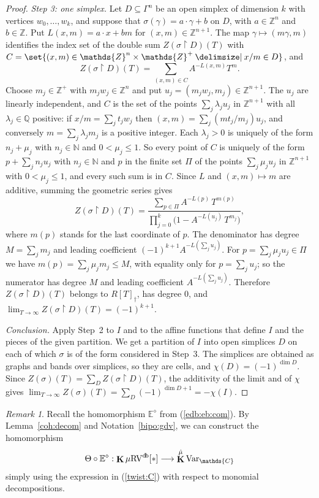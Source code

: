 \documentclass[12pt]{amsart}
\theoremstyle{plain}
\theoremstyle{definition}
\theoremstyle{remark}
\newtheorem{rem}[thm]{Remark}
\numberwithin{equation}{section}
\theoremstyle{plain}
\newcommand{\RV}{\textup{RV}}
\newcommand{\Z}{\mathds{Z}}
\newcommand{\C}{\mathds{C}}
\newcommand{\Q}{\mathds{Q}}
\newcommand{\N}{\mathds{N}}
\newcommand{\0}{\emptyset}
\newcommand{\bb}[1]{\mathbb{#1}}
\newcommand{\limplies}{\rightarrow}
\newcommand{\rest}{\upharpoonright}
\newcommand{\fun}{\longrightarrow}
\newcommand{\efun}{\longmapsto}
\newcommand{\sub}{\subseteq}
\providecommand\given{}
\newcommand\SetSymbol[1][]{%
\nonscript \: #1 \vert
\allowbreak
\nonscript\:
\mathopen{}}
\renewcommand\given{\SetSymbol[\delimsize]}
\newcommand{\mgRV}{{\mu}{\RV}}
\DeclareMathOperator{\ggk}{\mathbf{K}}
\DeclareMathOperator{\db}{d \! b}
\newcommand{\var}{\textup{Var}}
\newcommand{\gmv}{\ggk^{\hat \mu}\var_{\C}}
\begin{document}
\begin{proof}
\emph{Step 3: one simplex.} Let $D \sub \Gamma^n$ be an open simplex of dimension $k$ with vertices $w_0, \ldots, w_k$, and suppose that $\sigma(\gamma) = a \cdot \gamma + b$ on $D$, with $a \in \Z^n$ and $b \in \Z$. Put $L(x, m) = a \cdot x + b m$ for $(x, m) \in \Z^{n+1}$. The map $\gamma \efun (m\gamma, m)$ identifies the index set of the double sum $Z(\sigma \rest D)(T)$ with $C = \set{(x, m) \in \Z^n \times \Z^+ \given x/m \in D}$, and
\[
Z(\sigma \rest D)(T) = \sum_{(x,m) \in C} A^{-L(x,m)} T^m .
\]
Choose $m_j \in \Z^+$ with $m_j w_j \in \Z^n$ and put $u_j = (m_j w_j, m_j) \in \Z^{n+1}$. The $u_j$ are linearly independent, and $C$ is the set of the points $\sum_j \lambda_j u_j$ in $\Z^{n+1}$ with all $\lambda_j \in \Q$ positive: if $x/m = \sum_j t_j w_j$ then $(x, m) = \sum_j (m t_j / m_j) u_j$, and conversely $m = \sum_j \lambda_j m_j$ is a positive integer. Each $\lambda_j > 0$ is uniquely of the form $n_j + \mu_j$ with $n_j \in \N$ and $0 < \mu_j \leq 1$. So every point of $C$ is uniquely of the form $p + \sum_j n_j u_j$ with $n_j \in \N$ and $p$ in the finite set $\Pi$ of the points $\sum_j \mu_j u_j$ in $\Z^{n+1}$ with $0 < \mu_j \leq 1$, and every such sum is in $C$. Since $L$ and $(x, m) \efun m$ are additive, summing the geometric series gives
\[
Z(\sigma \rest D)(T) = \frac{\sum_{p \in \Pi} A^{-L(p)}\, T^{m(p)}}{\prod_{j=0}^{k} \bigl(1 - A^{-L(u_j)}\, T^{m_j}\bigr)},
\]
where $m(p)$ stands for the last coordinate of $p$. The denominator has degree $M = \sum_j m_j$ and leading coefficient $(-1)^{k+1} A^{-L(\sum_j u_j)}$. For $p = \sum_j \mu_j u_j \in \Pi$ we have $m(p) = \sum_j \mu_j m_j \leq M$, with equality only for $p = \sum_j u_j$; so the numerator has degree $M$ and leading coefficient $A^{-L(\sum_j u_j)}$. Therefore $Z(\sigma \rest D)(T)$ belongs to $R[T]_{\dag}$, has degree $0$, and $\lim_{T \limplies \infty}Z(\sigma \rest D)(T) = (-1)^{k+1}$.

\emph{Conclusion.} Apply Step~2 to $I$ and to the affine functions that define $I$ and the pieces of the given partition. We get a partition of $I$ into open simplices $D$ on each of which $\sigma$ is of the form considered in Step~3. The simplices are obtained as graphs and bands over simplices, so they are cells, and $\chi(D) = (-1)^{\dim D}$. Since $Z(\sigma)(T) = \sum_D Z(\sigma \rest D)(T)$, the additivity of the limit and of $\chi$ gives $\lim_{T \limplies \infty}Z(\sigma)(T) = \sum_D (-1)^{\dim D + 1} = -\chi(I)$.
\end{proof}

\begin{rem}
Recall the homomorphism $\bb E^{\diamond}$ from (\ref{edb:eb:com}).
By Lemma~\ref{coh:decom} and Notation~\ref{bipo:gdv}, we can construct the homomorphism
\[
\Theta \circ \bb E^{\diamond} : \ggk \mgRV^{\db}[*] \fun \gmv
\]
simply using the expression in (\ref{twist:C}) with respect to  monomial decompositions.
\end{rem}
\end{document}
